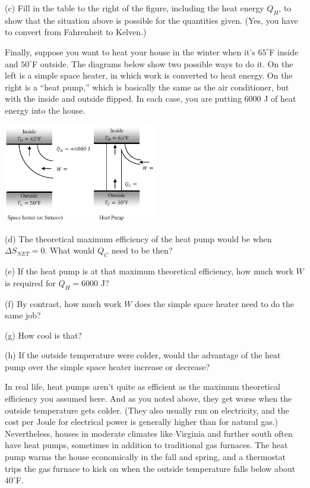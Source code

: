(c) Fill in the table to the right of the figure, including the heat energy $Q_H$, to show that the situation above is possible for the quantities given.  (Yes, you have to convert from Fahrenheit to Kelven.)
\answerspace{0.2 in}

\pagebreak[2]
Finally, suppose you want to heat your house in the winter when it's $65^\circ$F inside and $50^\circ$F outside.  The diagrams below show two possible ways to do it.  On the left is a simple space heater, in which work is converted to heat energy.  On the right is a ``heat pump,'' which is basically the same as the air conditioner, but with the inside and outside flipped.  In each case, you are putting 6000 J of heat energy into the house.

\begin{center}
\vspace{-0.2 in}
\includegraphics[width=0.5\textwidth]{entropy_is_it_possible/fig7.eps}
\vspace{-0.1 in}
\end{center}

(d) The theoretical maximum efficiency of the heat pump would be when $\Delta S_{NET}=0$.  What would $Q_C$ need to be then?
\answerspace{1.2 in}

(e) If the heat pump is at that maximum theoretical efficiency, how much work $W$ is required for $Q_H = 6000$ J?
 \answerspace{0.6 in}

(f) By contrast, how much work $W$ does the simple space heater need to do the same job? 
\answerspace{0.4 in}

(g) How cool is that?
\answerspace{0.4 in}

(h) If the outside temperature were colder, would the advantage of the heat pump over the simple space heater increase or decrease? 
\answerspace{0.4 in}

In real life, heat pumps aren't quite as efficient as the maximum theoretical efficiency you assumed here.  And as you noted above, they get worse when the outside temperature gets colder.  (They also usually run on electricity, and the cost per Joule for electrical power is generally higher than for natural gas.)  Nevertheless, houses in moderate climates like Virginia and further south often have heat pumps, sometimes in addition to traditional gas furnaces.  The heat pump warms the house economically in the fall and spring, and a thermostat trips the gas furnace to kick on when the outside temperature falls below about $40^\circ$F.

